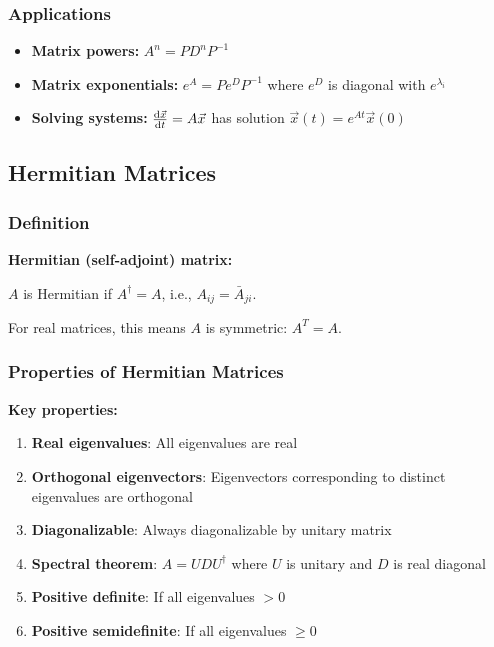 \documentclass[12pt,a4paper]{article}
\begin{document}
\subsubsection{Applications}
\begin{itemize}
    \item \textbf{Matrix powers:} $A^n = PD^nP^{-1}$
    \item \textbf{Matrix exponentials:} $e^A = Pe^DP^{-1}$ where $e^D$ is diagonal with $e^{\lambda_i}$
    \item \textbf{Solving systems:} $\dv{\vec{x}}{t} = A\vec{x}$ has solution $\vec{x}(t) = e^{At}\vec{x}(0)$
\end{itemize}

\subsection{Hermitian Matrices}
\subsubsection{Definition}
\begin{formulabox}
\textbf{Hermitian (self-adjoint) matrix:}

$A$ is Hermitian if $A^\dagger = A$, i.e., $A_{ij} = \bar{A}_{ji}$.

For real matrices, this means $A$ is symmetric: $A^T = A$.
\end{formulabox}

\subsubsection{Properties of Hermitian Matrices}
\begin{importantbox}
\textbf{Key properties:}
\begin{enumerate}
    \item \textbf{Real eigenvalues}: All eigenvalues are real
    \item \textbf{Orthogonal eigenvectors}: Eigenvectors corresponding to distinct eigenvalues are orthogonal
    \item \textbf{Diagonalizable}: Always diagonalizable by unitary matrix
    \item \textbf{Spectral theorem}: $A = UDU^\dagger$ where $U$ is unitary and $D$ is real diagonal
    \item \textbf{Positive definite}: If all eigenvalues $> 0$
    \item \textbf{Positive semidefinite}: If all eigenvalues $\geq 0$
\end{enumerate}
\end{importantbox}
\end{document}
